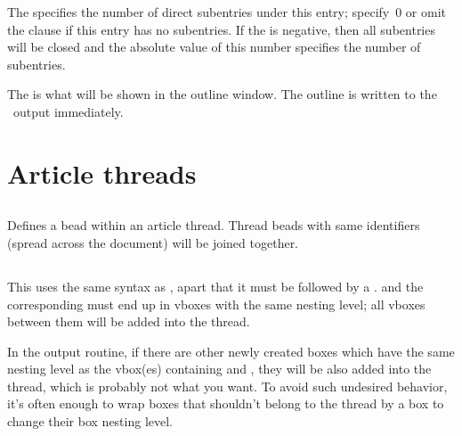 \documentclass{pdftexmanual}
\begin{document}
The   specifies the number of direct
subentries under this entry; specify~0 or omit the clause if this entry
has no subentries. If the  is negative, then all
subentries will be closed and the absolute value of this number
specifies the number of subentries.

The  is what will be shown in the outline
window. The outline is written to the \PDF\ output immediately.

\section{Article threads}

\subsection{}

Defines a bead within an article thread. Thread beads with same
identifiers (spread across the document) will be joined together.

\subsection{}

This uses the same syntax as , apart that it must be
followed by a .   and the
corresponding  must end up in vboxes with the same
nesting level; all vboxes between them will be added into the thread.

In the output routine, if there are other newly created boxes which have
the same nesting level as the vbox(es) containing 
and , they will be also added into the thread, which is
probably not what you want. To avoid such undesired behavior, it's often
enough to wrap boxes that shouldn't belong to the thread by a box to
change their box nesting level.

\subsection{}
\end{document}
